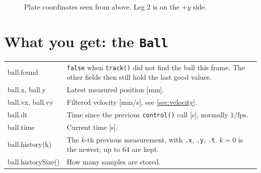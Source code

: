 \documentclass[10pt,a4paper]{article}
\begin{document}
\begin{figure}[h]
\centering
{}
\caption{Plate coordinates seen from above. Leg 2 is on the $+y$ side.}
\label{fig:plate}
\end{figure}

\section{What you get: the \texttt{Ball}}
\begin{center}
\begin{tabularx}{\textwidth}{>{\ttfamily}lX}
\toprule
ball.found & \texttt{false} when \texttt{track()} did not find the ball this frame. The other
             fields then still hold the last good values.\\
ball.x, ball.y & Latest measured position [mm].\\
ball.vx, ball.vy & Filtered velocity [mm/s], see \cref{sec:velocity}.\\
ball.dt & Time since the previous \texttt{control()} call [s], normally $1/\text{fps}$.\\
ball.time & Current time [s].\\
ball.history(k) & The $k$-th previous measurement, with \texttt{.x}, \texttt{.y}, \texttt{.t}.
                  $k=0$ is the newest; up to 64 are kept.\\
ball.historySize() & How many samples are stored.\\
\bottomrule
\end{tabularx}
\end{center}
\end{document}
